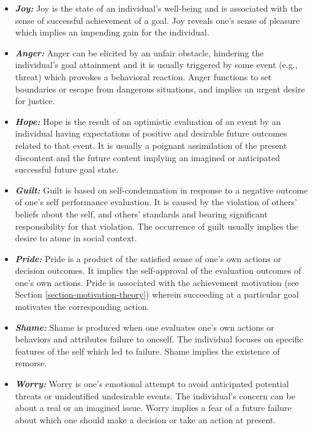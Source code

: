 \documentclass[12pt]{report}
\begin{document}
\begin{itemize}
  \item \textbf{\textit{Joy:}} Joy is the state of an individual's well-being
  and is associated with the sense of successful achievement of a goal. Joy
  reveals one's sense of pleasure which implies an impending gain for the
  individual.
  
  \item \textbf{\textit{Anger:}} Anger can be elicited by an unfair obstacle,
  hindering the individual's goal attainment and it is usually triggered by some
  event (e.g., threat) which provokes a behavioral reaction. Anger functions to
  set boundaries or escape from dangerous situations, and implies an urgent
  desire for justice.
  
  \item \textbf{\textit{Hope:}} Hope is the result of an optimistic evaluation
  of an event by an individual having expectations of positive and desirable
  future outcomes related to that event. It is usually a poignant assimilation
  of the present discontent and the future content implying an imagined or
  anticipated successful future goal state.
  
  \item \textbf{\textit{Guilt:}} Guilt is based on self-condemnation in response
  to a negative outcome of one's self performance evaluation. It is caused by
  the violation of others' beliefs about the self, and others' standards and
  bearing significant responsibility for that violation. The occurrence of
  guilt usually implies the desire to atone in social context.
  
  \item \textbf{\textit{Pride:}} Pride is a product of the satisfied sense of
  one's own actions or decision outcomes. It implies the self-approval of the
  evaluation outcomes of one's own actions. Pride is associated with the
  achievement motivation (see Section \ref{section-motivation-theory}) wherein
  succeeding at a particular goal motivates the corresponding action.
  
  \item \textbf{\textit{Shame:}} Shame is produced when one evaluates one's own
  actions or behaviors and attributes failure to oneself. The individual focuses
  on specific features of the self which led to failure. Shame implies the
  existence of remorse.
  
  \item \textbf{\textit{Worry:}} Worry is one's emotional attempt to avoid
  anticipated potential threats or unidentified undesirable events. The
  individual's concern can be about a real or an imagined issue. Worry implies a
  fear of a future failure about which one should make a decision or take an
  action at present.
\end{itemize}
\end{document}

